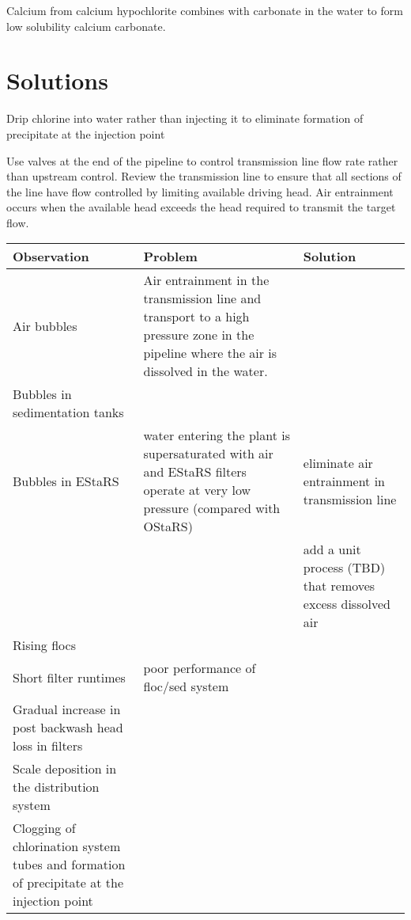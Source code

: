 \documentclass[letterpaper,10pt,english]{sphinxmanual}
\begin{document}
{Calcium from calcium hypochlorite combines with carbonate in the water to form low solubility calcium carbonate.


\chapter{Solutions}
\label{\detokenize{Troubleshooting/Troubleshooting:solutions}}
Drip chlorine into water rather than injecting it to eliminate formation of precipitate at the injection point

Use valves at the end of the pipeline to control transmission line flow rate rather than upstream control. Review the transmission line to ensure that all sections of the line have flow controlled by limiting available driving head. Air entrainment occurs when the available head exceeds the head required to transmit the target flow.


\begin{savenotes}\sphinxattablestart
\raggedright
{}
\label{\detokenize{Troubleshooting/Troubleshooting:id1}}\label{\detokenize{Troubleshooting/Troubleshooting:table-troubleshooting}}
\sphinxaftercaption
\begin{tabulary}{\linewidth}[t]{|T|T|T|}
\hline
\sphinxstyletheadfamily 
Observation
&\sphinxstyletheadfamily 
Problem
&\sphinxstyletheadfamily 
Solution
\\
\hline
Air bubbles
&
Air entrainment in the transmission line and transport to a high pressure zone in the pipeline where the air is dissolved in the water.
&\\
\hline
Bubbles in sedimentation tanks
&&\\
\hline
Bubbles in EStaRS
&
water entering the plant is supersaturated with air and EStaRS filters operate at very low pressure (compared with OStaRS)
&
eliminate air entrainment in transmission line
\\
\hline&&
add a unit process (TBD) that removes excess dissolved air
\\
\hline
Rising flocs
&&\\
\hline
Short filter runtimes
&
poor performance of floc/sed system
&\\
\hline
Gradual increase in post backwash head loss in filters
&&\\
\hline
Scale deposition in the distribution system
&&\\
\hline
Clogging of chlorination system tubes and formation of precipitate at the injection point
&&\\
\hline
\end{tabulary}
\par
\sphinxattableend\end{savenotes}

}
\end{document}

